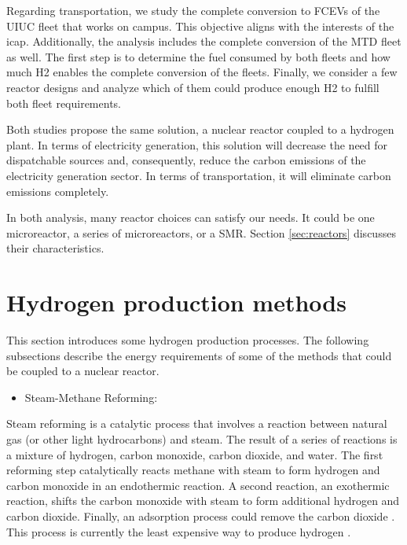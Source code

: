 \documentclass[11pt,letterpaper]{article}
\begin{document}
Regarding transportation, we study the complete conversion to \glspl{FCEV} of the \gls{UIUC} fleet that works on campus.
This objective aligns with the interests of the \gls{icap}.
Additionally, the analysis includes the complete conversion of the \gls{MTD} fleet as well.
The first step is to determine the fuel consumed by both fleets and how much \gls{H2} enables the complete conversion of the fleets.
Finally, we consider a few reactor designs and analyze which of them could produce enough \gls{H2} to fulfill both fleet requirements.

Both studies propose the same solution, a nuclear reactor coupled to a hydrogen plant.
In terms of electricity generation, this solution will decrease the need for dispatchable sources and, consequently, reduce the carbon emissions of the electricity generation sector.
In terms of transportation, it will eliminate carbon emissions completely.

In both analysis, many reactor choices can satisfy our needs.
It could be one microreactor, a series of microreactors, or a \gls{SMR}.
Section \ref{sec:reactors} discusses their characteristics.

\section{Hydrogen production methods}
\label{sec:hydro}

This section introduces some hydrogen production processes.
The following subsections describe the energy requirements of some of the methods that could be coupled to a nuclear reactor.

\begin{itemize}
	\item Steam-Methane Reforming:
\end{itemize}

Steam reforming is a catalytic process that involves a reaction between natural gas (or other light hydrocarbons) and steam.
The result of a series of reactions is a mixture of hydrogen, carbon monoxide, carbon dioxide, and water.
The first reforming step catalytically reacts methane with steam to form hydrogen and carbon monoxide in an endothermic reaction.
A second reaction, an exothermic reaction, shifts the carbon monoxide with steam to form additional hydrogen and carbon dioxide.
Finally, an adsorption process could remove the carbon dioxide \cite{harper_us_2012}.
This process is currently the least expensive way to produce hydrogen \cite{doe_office_of_energy_efficiency_and_renewable_energy_hydrogen_2020}.
\end{document}

